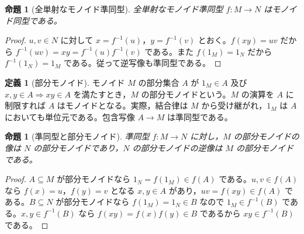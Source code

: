 \documentclass[a5paper,10pt,dvipdfmx]{jsarticle}
\theoremstyle{definition}
\newtheorem{defn}[ruledef]{定義}
\theoremstyle{plain}
\newtheorem{prop}[ruledef]{命題}
\begin{document}
\begin{prop}[全単射なモノイド準同型]\label{k173}
全単射なモノイド準同型 $f\colon M\to N$ はモノイド同型である。
\end{prop}
\begin{proof}
$u,v\in N$ に対して $x=f^{-1}(u)$，$y=f^{-1}(v)$ とおく。$f(xy)=uv$ だから $f^{-1}(uv)=xy=f^{-1}(u)f^{-1}(v)$ である。また $f(1_M)=1_N$ だから $f^{-1}(1_N)=1_M$ である。従って逆写像も準同型である。
\end{proof}
\begin{defn}[部分モノイド]\label{k174}
モノイド $M$ の部分集合 $A$ が $1_M\in A$ 及び $x,y\in A\Rightarrow xy\in A$ を満たすとき，$M$ の部分モノイドという。$M$ の演算を $A$ に制限すれば $A$ はモノイドとなる。実際，結合律は $M$ から受け継がれ，$1_M$ は $A$ においても単位元である。包含写像 $A\to M$ は準同型である。
\end{defn}
\begin{prop}[準同型と部分モノイド]\label{k175}
準同型 $f\colon M\to N$ に対し，$M$ の部分モノイドの像は $N$ の部分モノイドであり，$N$ の部分モノイドの逆像は $M$ の部分モノイドである。
\end{prop}
\begin{proof}
$A\subseteq M$ が部分モノイドなら $1_N=f(1_M)\in f(A)$ である。$u,v\in f(A)$ なら $f(x)=u$，$f(y)=v$ となる $x,y\in A$ があり，$uv=f(xy)\in f(A)$ である。$B\subseteq N$ が部分モノイドなら $f(1_M)=1_N\in B$ なので $1_M\in f^{-1}(B)$ である。$x,y\in f^{-1}(B)$ なら $f(xy)=f(x)f(y)\in B$ であるから $xy\in f^{-1}(B)$ である。
\end{proof}
\end{document}
